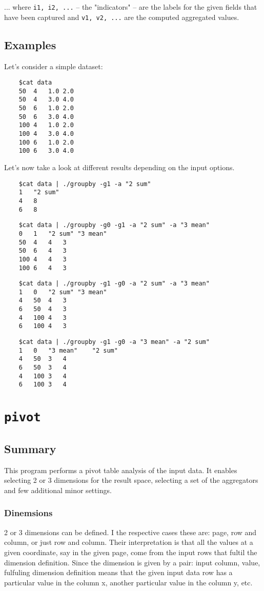 \documentclass{report}
\begin{document}
	... where \texttt{i1, i2, ...} -- the "indicators" -- are the labels for
	the given fields that have been captured and \texttt{v1, v2, ...} are
	the computed aggregated values.

	\subsection{Examples}
	Let's consider a simple dataset:
	\begin{verbatim}
	$cat data
	50	4	1.0	2.0
	50	4	3.0	4.0
	50	6	1.0	2.0
	50	6	3.0	4.0
	100	4	1.0	2.0
	100	4	3.0	4.0
	100	6	1.0	2.0
	100	6	3.0	4.0
	\end{verbatim}

	Let's now take a look at different results depending on the input options.

	\begin{verbatim}
	$cat data | ./groupby -g1 -a "2 sum"
	1	"2 sum"
	4	8
	6	8
	\end{verbatim}

	\begin{verbatim}
	$cat data | ./groupby -g0 -g1 -a "2 sum" -a "3 mean"
	0	1	"2 sum"	"3 mean"
	50	4	4	3
	50	6	4	3
	100	4	4	3
	100	6	4	3
	\end{verbatim}

	\begin{verbatim}
	$cat data | ./groupby -g1 -g0 -a "2 sum" -a "3 mean"
	1	0	"2 sum"	"3 mean"
	4	50	4	3
	6	50	4	3
	4	100	4	3
	6	100	4	3
	\end{verbatim}

	\begin{verbatim}
	$cat data | ./groupby -g1 -g0 -a "3 mean" -a "2 sum"
	1	0	"3 mean"	"2 sum"
	4	50	3	4
	6	50	3	4
	4	100	3	4
	6	100	3	4
	\end{verbatim}

\section{\texttt{pivot}}

	\subsection{Summary}
	This program performs a pivot table analysis of the input data. It enables
	selecting 2 or 3 dimensions for the result space, selecting a set of the
	aggregators and few additional minor settings.

	\subsubsection{Dinemsions}
	2 or 3 dimensions can be defined. I the respective cases these are: page, row
	and column, or just row and column. Their interpretation is that all the values
	at a given coordinate, say in the given page, come from the input rows that fultil
	the dimension definition. Since the dimension is given by a pair: input column,
	value, fulfuling dimension definition means that the given input data row has
	a particular value in the column x, another particular value in the column y, etc.
\end{document}
